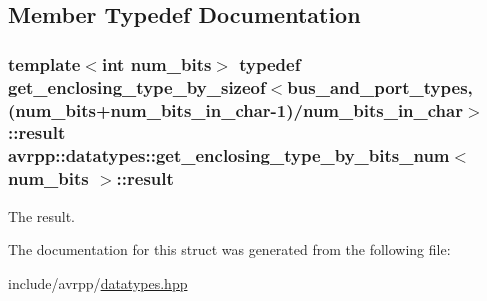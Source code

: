 \subsection{Member Typedef Documentation}
\hypertarget{structavrpp_1_1datatypes_1_1get__enclosing__type__by__bits__num_a5a646386afc0a101ca378ab8fdd3cd79}{
\subsubsection[{result}]{\setlength{\rightskip}{0pt plus 5cm}template$<$int num\_\-bits$>$ typedef get\_\-enclosing\_\-type\_\-by\_\-sizeof$<$bus\_\-and\_\-port\_\-types, (num\_\-bits+num\_\-bits\_\-in\_\-char-\/1)/num\_\-bits\_\-in\_\-char$>$::{\bf result} {\bf avrpp::datatypes::get\_\-enclosing\_\-type\_\-by\_\-bits\_\-num}$<$ num\_\-bits $>$::{\bf result}}}
\label{structavrpp_1_1datatypes_1_1get__enclosing__type__by__bits__num_a5a646386afc0a101ca378ab8fdd3cd79}


The result. 



The documentation for this struct was generated from the following file:\begin{DoxyCompactItemize}
\item 
include/avrpp/\hyperlink{datatypes_8hpp}{datatypes.hpp}\end{DoxyCompactItemize}
